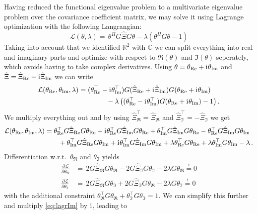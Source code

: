 Having reduced the functional eigenvalue problem to a multivariate eigenvalue problem over the covariance coefficient matrix, we may solve it using Lagrange optimization with the following Langrangian:
\begin{equation}
  \mathcal{L}(\theta,\lambda) = \, \theta^H G \hat{\Xi} G \theta - \lambda ( \theta^H G \theta - 1)
\end{equation}
Taking into account that we identified $\mathbb{R}^2$ with $\mathbb{C}$ we can split everything into real and imaginary parts and optimize with respect to $\Re(\theta)$ and $\Im(\theta)$ seperately, which avoids having to take complex derivatives.
Using $\theta = \theta_{\mathrm{Re}} + \mathrm{i}\mkern1mu \theta_{\mathrm{Im}}$ and $\hat{\Xi} = \hat\Xi_{\mathrm{Re}} + \mathrm{i}\mkern1mu \hat\Xi_{\mathrm{Im}}$ we can write
\begin{align*}
  \mathcal{L}(\theta_{\mathrm{Re}},\theta_{\mathrm{Im}},\lambda) & = 
    (\theta_{\mathrm{Re}}^\top - \mathrm{i}\mkern1mu \theta_{\mathrm{Im}}^\top) G ( \hat{\Xi}_{\mathrm{Re}} + \mathrm{i}\mkern1mu \hat\Xi_{\mathrm{Im}} ) G ( \theta_{\mathrm{Re}} + \mathrm{i}\mkern1mu \theta_{\mathrm{Im}} ) \\
  & \qquad \qquad - \lambda \left( (\theta_{\mathrm{Re}}^\top - \mathrm{i}\mkern1mu \theta_{\mathrm{Im}}^\top ) G (\theta_{\mathrm{Re}} + \mathrm{i}\mkern1mu \theta_{\mathrm{Im}}) - 1 \right).
\end{align*}
We multiply everything out and by using $\hat\Xi_\Re^\top = \hat\Xi_\Re$ and $\hat\Xi_\Im^\top = - \hat\Xi_\Im$ we get
\begin{align*}
  \mathcal{L}(\theta_{\mathrm{Re}},\theta_{\mathrm{Im}},\lambda) 
  & = \theta_{\mathrm{Re}}^\top G \hat\Xi_{\mathrm{Re}} G \theta_{\mathrm{Re}} 
    + \mathrm{i}\mkern1mu \theta_{\mathrm{Re}}^\top G \hat\Xi_{\mathrm{Im}} G \theta_{\mathrm{Re}} 
    + \theta_{\mathrm{Im}}^\top G \hat\Xi_{\mathrm{Im}} G \theta_{\mathrm{Re}}
    - \theta_{\mathrm{Re}}^\top G \hat\Xi_{\mathrm{Im}} G \theta_{\mathrm{Im}} \\
  & \qquad  + \theta_{\mathrm{Im}}^\top G \hat\Xi_{\mathrm{Re}} G \theta_{\mathrm{Im}}
    + \mathrm{i}\mkern1mu \theta_{\mathrm{Im}}^\top G \hat\Xi_{\mathrm{Im}} G \theta_{\mathrm{Im}} 
    + \lambda \theta_{\mathrm{Re}}^\top G \theta_{\mathrm{Re}} + \lambda \theta_{\mathrm{Im}}^\top G \theta_{\mathrm{Im}} - \lambda \,.
\end{align*}
Differentiation w.r.t.\ $\theta_\Re$ and $\theta_\Im$ yields
\begin{align}
  \frac{\partial \mathcal{L}}{\partial \theta_\Re} & = \, 
    2G\hat\Xi_\Re G \theta_\Re - 2G\hat\Xi_\Im G \theta_\Im - 2\lambda G\theta_\Re \overset{!}{=} 0 \label{eq:lagrRe}\\
  \frac{\partial \mathcal{L}}{\partial \theta_\Im} & = \,
    2G\hat\Xi_\Re G \theta_\Im + 2G\hat\Xi_\Im G \theta_\Re - 2\lambda G\theta_\Im \overset{!}{=} 0 \label{eq:lagrIm}
\end{align}
with the additional constraint $\theta_\Re^\top G \theta_\Re + \theta_\Im^\top G \theta_\Im = 1$.
We can simplify this further and multiply \cref{eq:lagrIm} by $\mathrm{i}\mkern1mu$, leading to
